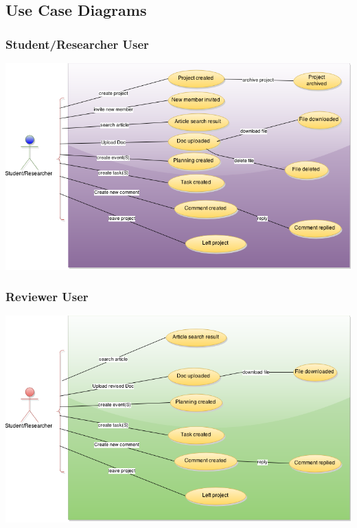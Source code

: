 \subsection{Use Case Diagrams} %
\subsubsection{Student/Researcher User} 

\begin{center}
\centering
\includegraphics[scale=0.3]{./img/dsgn_img/USECASE1.png}	
\end{center}


\subsubsection{Reviewer User} 
\begin{center}
\includegraphics[scale=0.3]{./img/dsgn_img/USECASE2.png}
	
\end{center}

